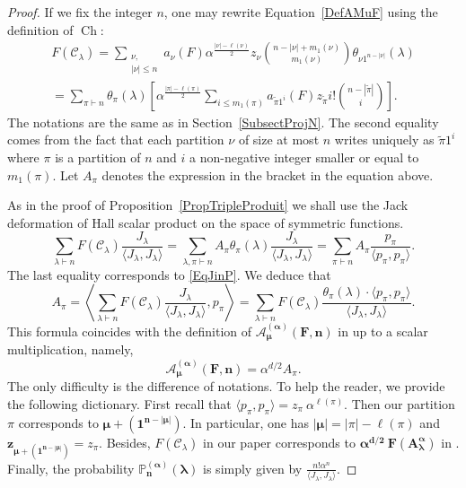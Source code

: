 \documentclass[11pt]{amsart}
\theoremstyle{plain}
\theoremstyle{remark}
\newcommand{\CCC}{\mathcal{C}}
\newcommand{\PP}{\mathbb{P}}
\DeclareMathOperator{\Ch}{Ch}
\begin{document}
\begin{proof}
    If we fix the integer $n$, one may rewrite
    Equation~\eqref{DefAMuF} using the definition of $\Ch$:
    \begin{multline*}
    F(\CCC_\lambda) = \sum_{\substack{\nu,\\ |\nu| \leq n}}
    a_\nu(F) \alpha^{\frac{|\nu|-\ell(\nu)}{2}} z_\nu \binom{n-|\nu|+m_1(\nu)}{m_1(\nu)}
    \theta_{\nu 1^{n-|\nu|}}(\lambda) \\
    = \sum_{\pi \vdash n}  \theta_\pi(\lambda)
    \left[\alpha^{\frac{|\pi|-\ell(\pi)}{2}} \sum_{i \leq m_1(\pi)}
    a_{\tilde{\pi} 1^i}(F) z_{\tilde{\pi}} i! 
    \binom{n-|\tilde{\pi}|}{i} \right].
    \end{multline*}
    The notations are the same as in Section~\ref{SubsectProjN}.
    The second equality comes from the fact that each partition $\nu$ of size
    at most $n$ writes uniquely as $\tilde{\pi} 1^i$ where $\pi$ is a partition
    of $n$ and $i$ a non-negative integer smaller or equal to $m_1(\pi)$.
    Let $A_\pi$ denotes the expression in the bracket in the equation above.

    As in the proof of Proposition~\ref{PropTripleProduit} we shall use
    the Jack deformation of Hall scalar product on the space of symmetric functions.
    \[ \sum_{\lambda \vdash n} F(\CCC_\lambda) 
    \frac{J_\lambda}{\langle J_\lambda, J_\lambda \rangle} 
    = \sum_{\lambda,\pi \vdash n} A_\pi \theta_\pi(\lambda) 
    \frac{J_\lambda}{\langle J_\lambda, J_\lambda \rangle} 
    = \sum_{\pi \vdash n} A_\pi \frac{p_\pi}{\langle p_\pi,p_\pi \rangle}.\]
    The last equality corresponds to \eqref{EqJinP}.
    We deduce that
    \[A_\pi = \left\langle \sum_{\lambda \vdash n} F(\CCC_\lambda)             
        \frac{J_\lambda}{\langle J_\lambda, J_\lambda \rangle},
        p_\pi \right\rangle =
        \sum_{\lambda \vdash n} F(\CCC_\lambda) \frac{\theta_\pi(\lambda)
        \cdot \langle p_\pi,p_\pi \rangle
        }{\langle J_\lambda, J_\lambda \rangle}.\]
    This formula coincides with the definition of $\bm{\mathcal{A}_\mu^{(\alpha)}(F,n)}$
    in \cite[paragraph 8.3]{MatsumotoOddJM} up to a scalar multiplication, namely,
    \[ \bm{\mathcal{A}_\mu^{(\alpha)}(F,n)} = \alpha^{d/2} A_\pi.\]
    The only difficulty is the difference of notations.
    To help the reader, we provide the following dictionary.
    First recall that $\langle p_\pi,p_\pi \rangle = z_\pi\ \alpha^{\ell(\pi)}$.
    Then our partition $\pi$ corresponds to $\bm{\mu + (1^{n-|\mu|})}$.
    In particular, one has  $\bm{|\mu|}=|\pi|-\ell(\pi)$ and $\bm{z_{\mu + (1^{n-|\mu|})}}=z_\pi$.
    Besides, $F(\CCC_\lambda)$ in our paper corresponds to
    $\bm{\alpha^{d/2}\ F(A_\lambda^{\alpha})}$ in \cite{MatsumotoOddJM}.
    Finally, the probability $\bm{\PP_n^{(\alpha)}(\lambda)}$ is simply given
    by $\frac{n! \alpha^n}{\langle J_\lambda, J_\lambda \rangle}$.
\end{proof}
\end{document}
